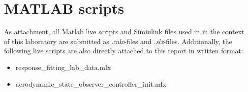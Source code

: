 \chapter{MATLAB scripts}
\label{chapter:MATLAB_script}
As attachment, all Matlab live scripts and Simiulink files used in in the context of this laboratory are submitted as \textit{.mlx}-files and \textit{.slx}-files. Additionally, the following live scripts are also directly attached to this report in written format: 
    \begin{itemize}
        \item response\_fitting\_lab\_data.mlx
        \item aerodynamic\_state\_observer\_controller\_init.mlx
    \end{itemize}
